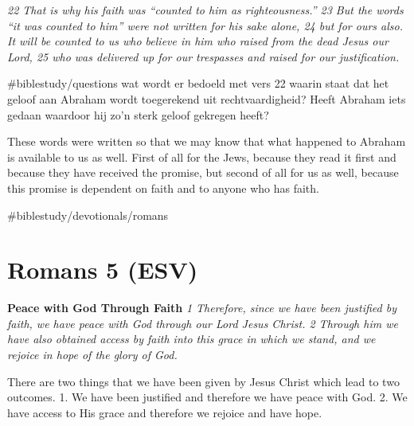 \emph{22 That is why his faith was ``counted to him as righteousness.''
23 But the words ``it was counted to him'' were not written for his sake
alone, 24 but for ours also. It will be counted to us who believe in him
who raised from the dead Jesus our Lord, 25 who was delivered up for our
trespasses and raised for our justification.}

\#biblestudy/questions wat wordt er bedoeld met vers 22 waarin staat dat
het geloof aan Abraham wordt toegerekend uit rechtvaardigheid? Heeft
Abraham iets gedaan waardoor hij zo'n sterk geloof gekregen heeft?

These words were written so that we may know that what happened to
Abraham is available to us as well. First of all for the Jews, because
they read it first and because they have received the promise, but
second of all for us as well, because this promise is dependent on faith
and to anyone who has faith.

\#biblestudy/devotionals/romans

\hypertarget{romans-5-esv}{%
\section{Romans 5 (ESV)}\label{romans-5-esv}}

\textbf{Peace with God Through Faith} \emph{1 Therefore, since we have
been justified by faith, we have peace with God through our Lord Jesus
Christ. 2 Through him we have also obtained access by faith into this
grace in which we stand, and we rejoice in hope of the glory of God.}

There are two things that we have been given by Jesus Christ which lead
to two outcomes. 1. We have been justified and therefore we have peace
with God. 2. We have access to His grace and therefore we rejoice and
have hope.

